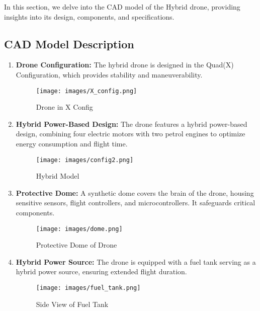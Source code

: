 \documentclass[preprint,12pt]{elsarticle}
\begin{document}
In this section, we delve into the CAD model of the Hybrid drone, providing insights into its design, components, and specifications.

\subsection{CAD Model Description}

\begin{enumerate}
    \item \textbf{Drone Configuration:} The hybrid drone is designed in the Quad(X) Configuration, which provides stability and maneuverability.

    \begin{figure}[!htbp]
    \centering
    \texttt{[image: images/X\_config.png]}
    \caption{Drone in X Config}
    \end{figure}

    \item \textbf{Hybrid Power-Based Design:} The drone features a hybrid power-based design, combining four electric motors with two petrol engines to optimize energy consumption and flight time.

    \begin{figure}[!htbp]
    \vspace{-3.5cm}
    \centering
    \texttt{[image: images/config2.png]}
    \caption{Hybrid Model}
    \end{figure}

    \item \textbf{Protective Dome:} A synthetic dome covers the brain of the drone, housing sensitive sensors, flight controllers, and microcontrollers. It safeguards critical components.

    \begin{figure}[!htbp]
    \centering
    \texttt{[image: images/dome.png]}
    \caption{Protective Dome of Drone}
    \end{figure}

    \item \textbf{Hybrid Power Source:} The drone is equipped with a fuel tank serving as a hybrid power source, ensuring extended flight duration.\\

    \begin{figure}[!htbp]
    \centering
    \vspace{-7mm}
    \texttt{[image: images/fuel\_tank.png]}
    \caption{Side View of Fuel Tank}
    \end{figure}
    

\end{enumerate}
\end{document}
